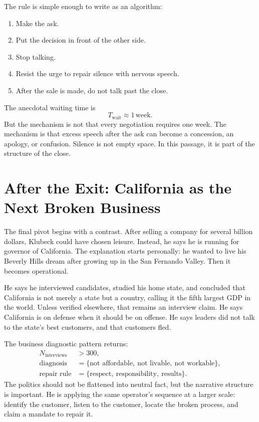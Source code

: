 The rule is simple enough to write as an algorithm:
\begin{enumerate}
\item Make the ask.
\item Put the decision in front of the other side.
\item Stop talking.
\item Resist the urge to repair silence with nervous speech.
\item After the sale is made, do not talk past the close.
\end{enumerate}

The anecdotal waiting time is
\begin{equation}
T_{\text{wait}}\approx 1\,\text{week}.
\end{equation}
But the mechanism is not that every negotiation requires one week. The mechanism is that excess speech after the ask can become a concession, an apology, or confusion. Silence is not empty space. In this passage, it is part of the structure of the close.

\section{After the Exit: California as the Next Broken Business}

The final pivot begins with a contrast. After selling a company for several billion dollars, Klubeck could have chosen leisure. Instead, he says he is running for governor of California. The explanation starts personally: he wanted to live his Beverly Hills dream after growing up in the San Fernando Valley. Then it becomes operational.

He says he interviewed candidates, studied his home state, and concluded that California is not merely a state but a country, calling it the fifth largest GDP in the world. Unless verified elsewhere, that remains an interview claim. He says California is on defense when it should be on offense. He says leaders did not talk to the state's best customers, and that customers fled.

The business diagnostic pattern returns:
\begin{align}
N_{\text{interviews}} &> 300,\\
\text{diagnosis} &= \{\text{not affordable},\ \text{not livable},\ \text{not workable}\},\\
\text{repair rule} &= \{\text{respect},\ \text{responsibility},\ \text{results}\}.
\end{align}
The politics should not be flattened into neutral fact, but the narrative structure is important. He is applying the same operator's sequence at a larger scale: identify the customer, listen to the customer, locate the broken process, and claim a mandate to repair it.

